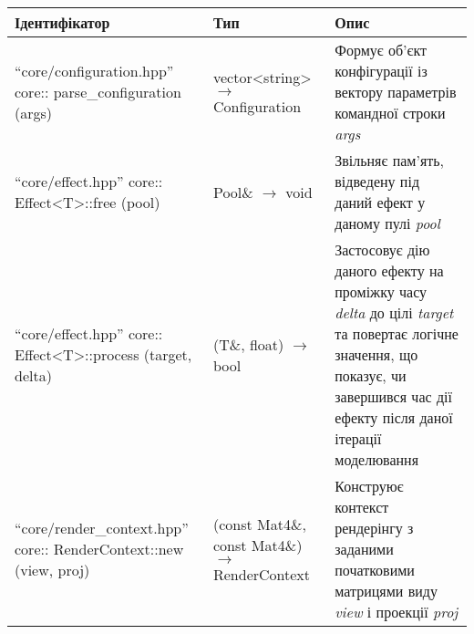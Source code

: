 \small{
  \begin{longtable}{| C{6cm} | C{4cm} | C{5cm} |}
    \hline
    Ідентифікатор & Тип & Опис \\

    \hline
    ``core/configuration.hpp'' \newline core:: \newline parse_configuration \newline (args)
    & vector<string> $\to$ Configuration
    & Формує об'єкт конфігурації із вектору параметрів командної строки \emph{args} \\
    \hline
    ``core/effect.hpp'' \newline core:: \newline Effect<T>::free \newline (pool)
    & Pool\& $\to$ void
    & Звільняє пам'ять, відведену під даний ефект у даному пулі \emph{pool} \\
    \hline
    ``core/effect.hpp'' \newline core:: \newline Effect<T>::process \newline (target, delta)
    & (T\&, float) $\to$ bool
    & Застосовує дію даного ефекту на проміжку часу \emph{delta}
    до цілі \emph{target} та повертає логічне значення, що показує,
    чи завершився час дії ефекту після даної ітерації моделювання \\
    \hline
    ``core/render_context.hpp'' \newline core:: \newline
    RenderContext::new \newline (view, proj)
    & (const Mat4\&, const Mat4\&) $\to$ RenderContext
    & Конструює контекст рендерінгу з заданими початковими
    матрицями виду \emph{view} і проекції \emph{proj} \\


\end{longtable}}
